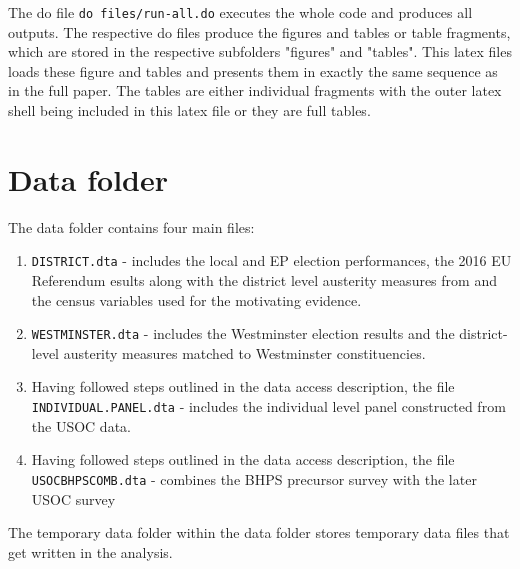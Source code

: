 \documentclass[[a4paper,11pt]{article}
\newcommand{\code}[1]{\texttt{#1}}
\begin{document}
The do file \code{do files/run-all.do} executes the whole code and produces all outputs. The respective do files produce the figures and tables or table fragments, which are stored in the respective subfolders "figures" and "tables". This latex files loads these figure and tables and presents them in exactly the same sequence as in the full paper. The tables are either individual fragments with the outer latex shell being included in this latex file or they are full tables. 


\section{Data folder}

The data folder contains four main files:

\begin{enumerate}

\item \code{DISTRICT.dta} - includes the local and EP election performances, the 2016 EU Referendum esults along with the district level austerity measures from \cite{Beatty2013} and the census variables used for the motivating evidence.

\item \code{WESTMINSTER.dta} - includes the Westminster election results and the district-level austerity measures matched to Westminster constituencies.

\item Having followed steps outlined in the data access description, the file \code{INDIVIDUAL.PANEL.dta} - includes the individual level panel constructed from the USOC data.

\item Having followed steps outlined in the data access description, the file \code{USOCBHPSCOMB.dta}  - combines the BHPS precursor survey with the later USOC survey
 
\end{enumerate}

The temporary data folder within the data folder stores temporary data files that get written in the analysis.

\clearpage


\end{document}
